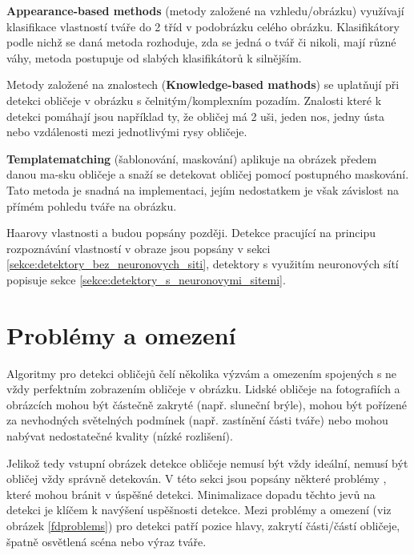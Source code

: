 \textbf{Appearance-based methods} (metody založené na vzhledu/obrázku) využívají klasifikace vlastností tváře do 2 tříd v podobrázku celého obrázku. Klasifikátory podle nichž se daná metoda rozhoduje, zda se jedná o tvář či nikoli, mají různé váhy, metoda postupuje od slabých klasifikátorů k silnějším.

Metody založené na znalostech (\textbf{Knowledge-based mathods}) se uplatňují při detekci obličeje v obrázku s čelnitým/komplexním pozadím. Znalosti které k detekci pomáhají jsou například ty, že obličej má 2 uši, jeden nos, jedny ústa nebo vzdálenosti mezi jednotlivými rysy obličeje.

\textbf{Templatematching} (šablonování, maskování) aplikuje na obrázek předem danou ma-sku obličeje a snaží se detekovat obličej pomocí postupného maskování. Tato metoda je snadná na implementaci, jejím nedostatkem je však závislost na přímém pohledu tváře na obrázku.

Haarovy vlastnosti a budou popsány později.
Detekce pracující na principu rozpoznávání vlastností v obraze jsou popsány v sekci 
\ref{sekce:detektory_bez_neuronovych_siti}, 
detektory s využitím neuronových sítí popisuje sekce \ref{sekce:detektory_s_neuronovymi_sitemi}.



\section{Problémy a omezení}
\label{sekce:problemy}
Algoritmy pro detekci obličejů čelí několika výzvám a omezením spojených s ne vždy perfektním zobrazením obličeje v obrázku. Lidské obličeje na fotografiích a obrázcích mohou být částečně zakryté (např. sluneční brýle), mohou být pořízené za nevhodných světelných podmínek (např. zastínění části tváře) nebo mohou nabývat nedostatečné kvality (nízké rozlišení).

Jelikož tedy vstupní obrázek detekce obličeje nemusí být vždy ideální, nemusí být obličej vždy správně detekován.
V této sekci jsou popsány některé problémy \cite{feature-based-fd-review, fdReview}, které mohou bránit v úspěšné detekci. Minimalizace dopadu těchto jevů na detekci je klíčem k navýšení uspěšnosti detekce. Mezi problémy a omezení (viz obrázek \ref{fdproblems}) pro detekci patří pozice hlavy, zakrytí části/částí obličeje, špatně osvětlená scéna nebo výraz tváře.

